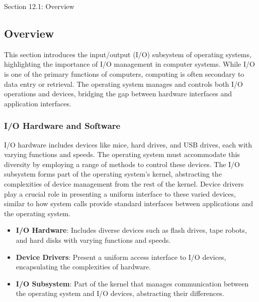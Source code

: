 \begin{notes}{Section 12.1: Overview}
    \subsection*{Overview}

    This section introduces the input/output (I/O) subsystem of operating systems, highlighting the importance of I/O management in computer systems. While I/O is one of the primary functions of 
    computers, computing is often secondary to data entry or retrieval. The operating system manages and controls both I/O operations and devices, bridging the gap between hardware interfaces and 
    application interfaces.
    
    \subsubsection*{I/O Hardware and Software}
    
    I/O hardware includes devices like mice, hard drives, and USB drives, each with varying functions and speeds. The operating system must accommodate this diversity by employing a range of methods 
    to control these devices. The I/O subsystem forms part of the operating system's kernel, abstracting the complexities of device management from the rest of the kernel. Device drivers play a crucial 
    role in presenting a uniform interface to these varied devices, similar to how system calls provide standard interfaces between applications and the operating system.
    
    \begin{highlight}
    
        \begin{itemize}
            \item \textbf{I/O Hardware}: Includes diverse devices such as flash drives, tape robots, and hard disks with varying functions and speeds.
            \item \textbf{Device Drivers}: Present a uniform access interface to I/O devices, encapsulating the complexities of hardware.
            \item \textbf{I/O Subsystem}: Part of the kernel that manages communication between the operating system and I/O devices, abstracting their differences.
        \end{itemize}
    
    \end{highlight}
    

\end{notes}

